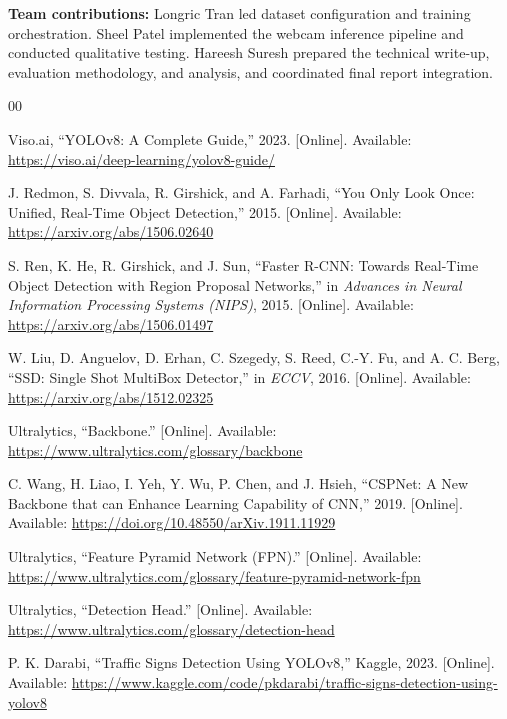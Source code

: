 \documentclass[conference]{IEEEtran}
\begin{document}
\vspace{0.4em}
\noindent\textbf{Team contributions:} Longric Tran led dataset configuration and training orchestration. Sheel Patel implemented the webcam inference pipeline and conducted qualitative testing. Hareesh Suresh prepared the technical write-up, evaluation methodology, and analysis, and coordinated final report integration.

\balance
\begin{thebibliography}{00}

Viso.ai, ``YOLOv8: A Complete Guide,'' 2023. [Online]. Available: \url{https://viso.ai/deep-learning/yolov8-guide/}

J. Redmon, S. Divvala, R. Girshick, and A. Farhadi, ``You Only Look Once: Unified, Real-Time Object Detection,'' 2015. [Online]. Available: \url{https://arxiv.org/abs/1506.02640}

S. Ren, K. He, R. Girshick, and J. Sun, ``Faster R-CNN: Towards Real-Time Object Detection with Region Proposal Networks,'' in \emph{Advances in Neural Information Processing Systems (NIPS)}, 2015. [Online]. Available: \url{https://arxiv.org/abs/1506.01497}

W. Liu, D. Anguelov, D. Erhan, C. Szegedy, S. Reed, C.-Y. Fu, and A. C. Berg, ``SSD: Single Shot MultiBox Detector,'' in \emph{ECCV}, 2016. [Online]. Available: \url{https://arxiv.org/abs/1512.02325}

Ultralytics, ``Backbone.'' [Online]. Available: \url{https://www.ultralytics.com/glossary/backbone}

C. Wang, H. Liao, I. Yeh, Y. Wu, P. Chen, and J. Hsieh, ``CSPNet: A New Backbone that can Enhance Learning Capability of CNN,'' 2019. [Online]. Available: \url{https://doi.org/10.48550/arXiv.1911.11929}

Ultralytics, ``Feature Pyramid Network (FPN).'' [Online]. Available: \url{https://www.ultralytics.com/glossary/feature-pyramid-network-fpn}

Ultralytics, ``Detection Head.'' [Online]. Available: \url{https://www.ultralytics.com/glossary/detection-head}

P. K. Darabi, ``Traffic Signs Detection Using YOLOv8,'' Kaggle, 2023. [Online]. Available: \url{https://www.kaggle.com/code/pkdarabi/traffic-signs-detection-using-yolov8}

\end{thebibliography}
\end{document}
